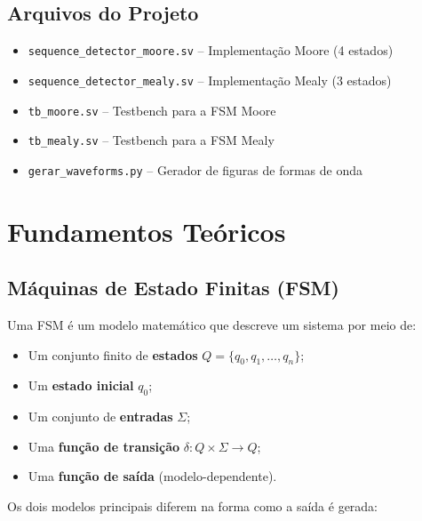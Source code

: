 \documentclass[12pt,a4paper]{article}
\begin{document}
\subsection{Arquivos do Projeto}

\begin{itemize}[leftmargin=1.5cm]
  \item \texttt{sequence\_detector\_moore.sv} -- Implementação Moore (4 estados)
  \item \texttt{sequence\_detector\_mealy.sv} -- Implementação Mealy (3 estados)
  \item \texttt{tb\_moore.sv} -- Testbench para a FSM Moore
  \item \texttt{tb\_mealy.sv} -- Testbench para a FSM Mealy
  \item \texttt{gerar\_waveforms.py} -- Gerador de figuras de formas de onda
\end{itemize}

\section{Fundamentos Teóricos}

\subsection{Máquinas de Estado Finitas (FSM)}

Uma FSM é um modelo matemático que descreve um sistema por meio de:
\begin{itemize}[leftmargin=1.5cm]
  \item Um conjunto finito de \textbf{estados} $Q = \{q_0, q_1, \ldots, q_n\}$;
  \item Um \textbf{estado inicial} $q_0$;
  \item Um conjunto de \textbf{entradas} $\Sigma$;
  \item Uma \textbf{função de transição} $\delta: Q \times \Sigma \rightarrow Q$;
  \item Uma \textbf{função de saída} (modelo-dependente).
\end{itemize}

Os dois modelos principais diferem na forma como a saída é gerada:
\end{document}
